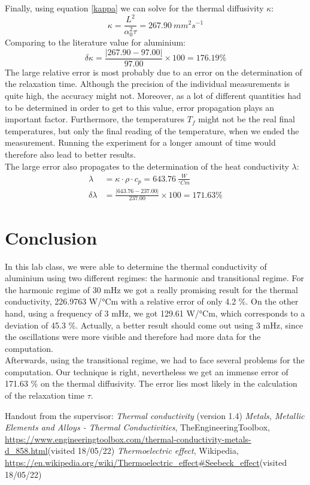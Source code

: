\documentclass{scrartcl}
\begin{document}
Finally, using equation \ref{kappa} we can solve for the thermal diffusivity $\kappa$:
\[\kappa=\frac{L^2}{\alpha_0^2\tau}=267.90\ mm^2s^{-1}\]
Comparing to the literature value for aluminium:
\[\delta\kappa=\frac{|267.90-97.00|}{97.00}\times100=176.19\%\]
The large relative error is most probably due to an error on the determination of the relaxation time. Although the precision of the individual measurements is quite high, the accuracy might not. Moreover, as a lot of different quantities had to be determined in order to get to this value, error propagation plays an important factor. Furthermore, the temperatures $T_f$ might not be the real final temperatures, but only the final reading of the temperature, when we ended the measurement. Running the experiment for a longer amount of time would therefore also lead to better results.\\
The large error also propagates to the determination of the heat conductivity $\lambda$:
\begin{align*}
    \lambda &=\kappa\cdot\rho\cdot c_p = 643.76\ \frac{W}{^{\circ}Cm}\\
    \delta\lambda &=\frac{|643.76-237.00|}{237.00}\times100= 171.63\%
\end{align*}


\section{Conclusion}
In this lab class, we were able to determine the thermal conductivity of aluminium using two different regimes: the harmonic and transitional regime. For the harmonic regime of 30 mHz we got a really promising result for the thermal conductivity, 226.9763 W/°Cm with a relative error of only 4.2 \%. On the other hand, using a frequency of 3 mHz, we got 129.61 W/°Cm, which corresponds to a deviation of 45.3 \%. Actually, a better result should come out using 3 mHz, since the oscillations were more visible and therefore had more data for the computation.\\
Afterwards, using the transitional regime, we had to face several problems for the computation. Our technique is right, nevertheless we get an immense error of 171.63 \% on the thermal diffusivity. The error lies most likely in the calculation of the relaxation time $\tau$.



\begin{thebibliography}{}
 Handout from the supervisor: \textit{Thermal conductivity} (version 1.4)
 \textit{Metals, Metallic Elements and Alloys - Thermal Conductivities}, TheEngineeringToolbox, \url{https://www.engineeringtoolbox.com/thermal-conductivity-metals-d_858.html}(visited 18/05/22)
 \textit{Thermoelectric effect}, Wikipedia, \url{https://en.wikipedia.org/wiki/Thermoelectric_effect#Seebeck_effect}(visited 18/05/22)

\end{thebibliography}
\end{document}
